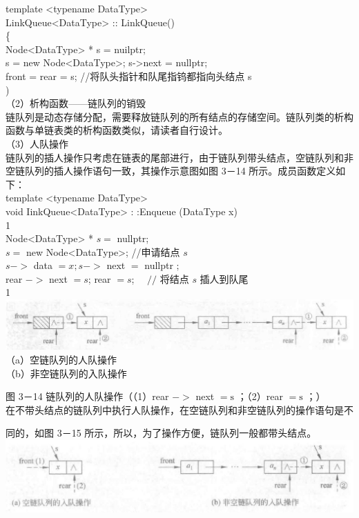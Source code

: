 \documentclass[10pt]{article}
\begin{document}
template <typename DataType>\\
LinkQueue<DataType> :: LinkQueue()\\
\{\\
Node<DataType> * s = nuilptr;\\
s = new Node<DataType>; s->next = nullptr;\\
front = rear = s; //将队头指针和队尾指钨都指向头结点 s\\
)\\
（2）析构函数——链队列的销毁\\
链队列是动态存储分配，需要释放链队列的所有结点的存储空间。链队列类的析构函数与单链表类的析构函数类似，请读者自行设计。\\
（3）人队操作\\
链队列的插人操作只考虑在链表的尾部进行，由于链队列带头结点，空链队列和非空链队列的插人操作语句一致，其操作示意图如图 3－14 所示。成员函数定义如下：\\
template <typename DataType>\\
void IinkQueue<DataType> : :Enqueue (DataType x)\\
1\\
Node<DataType> * $s=$ nullptr;\\
$s=$ new Node<DataType>; //申请结点 $s$\\
$s->$ data $=x ; s->$ next $=$ nullptr $;$\\
rear $->$ next $=s$; rear $=s$; $\quad / /$ 将结点 $s$ 插人到队尾\\
1\\
\includegraphics[max width=\textwidth, center]{2025_06_06_704745ea57b15b2333e5g-097}\\
（a）空链队列的人队操作\\
（b）非空链队列的入队操作

图 3－14 链队列的人队操作（（1）rear $->$ next $=\mathrm{s}$ ；（2）rear $=\mathrm{s}$ ；）\\
在不带头结点的链队列中执行人队操作，在空链队列和非空链队列的操作语句是不

同的，如图 3－15 所示，所以，为了操作方便，链队列一般都带头结点。\\
\includegraphics[max width=\textwidth, center]{2025_06_06_704745ea57b15b2333e5g-098(1)}
\end{document}
